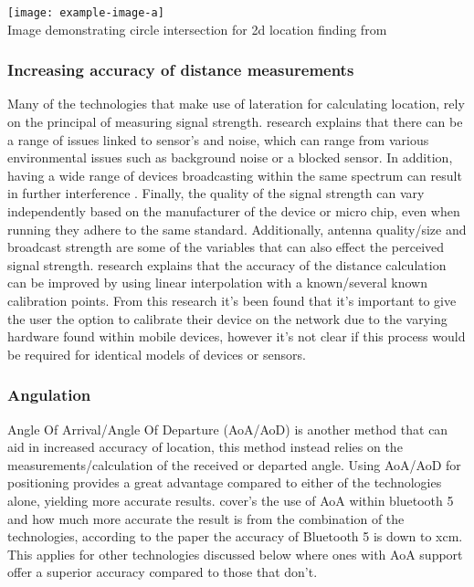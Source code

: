 \begin{center}
	\texttt{[image: example-image-a]}\\
	Image demonstrating circle intersection for 2d location finding from \citetemp
\end{center}

\subsubsection{Increasing accuracy of distance measurements}
Many of the technologies that make use of lateration for calculating location, rely on the principal of measuring signal strength. \citetemp research explains that there can be a range of issues linked to sensor's and noise, which can range from various environmental issues such as background noise or a blocked sensor. In addition, having a wide range of devices broadcasting within the same spectrum can result in further interference \citetemp. Finally, the quality of the  signal strength can vary independently based on the manufacturer of the device or micro chip, even when running they adhere to the same standard. Additionally, antenna quality/size and broadcast strength are some of the variables that can also effect the perceived signal strength. \citetemp research explains that the accuracy of the distance calculation can be improved by using linear interpolation with a known/several known calibration points. From this research it's been found that it's important to give the user the option to calibrate their device on the network due to the varying hardware found within mobile devices, however it's not clear if this process would be required for identical models of devices or sensors.\\

\subsubsection{Angulation}
Angle Of Arrival/Angle Of Departure (AoA/AoD) is another method that can aid in increased accuracy of location, this method instead relies on the measurements/calculation of the received or departed angle. Using AoA/AoD for positioning provides a great advantage compared to either of the technologies alone, yielding more accurate results. \citetemp cover's the use of AoA within bluetooth 5 and how much more accurate the result is from the combination of the technologies, according to the paper the accuracy of Bluetooth 5 is down to xcm. This applies for other technologies discussed below where ones with AoA support offer a superior accuracy compared to those that don't.

